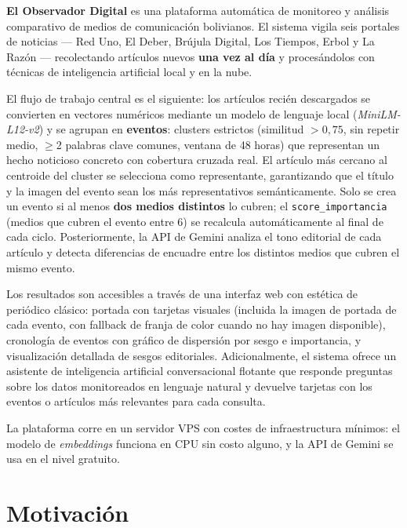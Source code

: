 \documentclass[12pt,a4paper]{article}
\begin{document}
\textbf{El Observador Digital} es una plataforma automática de monitoreo y análisis comparativo de medios de comunicación bolivianos. El sistema vigila seis portales de noticias --- Red Uno, El Deber, Brújula Digital, Los Tiempos, Erbol y La Razón --- recolectando artículos nuevos \textbf{una vez al día} y procesándolos con técnicas de inteligencia artificial local y en la nube.

El flujo de trabajo central es el siguiente: los artículos recién descargados se convierten en vectores numéricos mediante un modelo de lenguaje local (\textit{MiniLM-L12-v2}) y se agrupan en \textbf{eventos}: clusters estrictos (similitud $> 0{,}75$, sin repetir medio, $\geq$2 palabras clave comunes, ventana de 48 horas) que representan un hecho noticioso concreto con cobertura cruzada real. El artículo más cercano al centroide del cluster se selecciona como representante, garantizando que el título y la imagen del evento sean los más representativos semánticamente. Solo se crea un evento si al menos \textbf{dos medios distintos} lo cubren; el \texttt{score\_importancia} (medios que cubren el evento entre 6) se recalcula automáticamente al final de cada ciclo. Posteriormente, la API de Gemini analiza el tono editorial de cada artículo y detecta diferencias de encuadre entre los distintos medios que cubren el mismo evento.

Los resultados son accesibles a través de una interfaz web con estética de periódico clásico: portada con tarjetas visuales (incluida la imagen de portada de cada evento, con fallback de franja de color cuando no hay imagen disponible), cronología de eventos con gráfico de dispersión por sesgo e importancia, y visualización detallada de sesgos editoriales. Adicionalmente, el sistema ofrece un asistente de inteligencia artificial conversacional flotante que responde preguntas sobre los datos monitoreados en lenguaje natural y devuelve tarjetas con los eventos o artículos más relevantes para cada consulta.

La plataforma corre en un servidor VPS con costes de infraestructura mínimos: el modelo de \textit{embeddings} funciona en CPU sin costo alguno, y la API de Gemini se usa en el nivel gratuito.

\section{Motivación}
\end{document}
